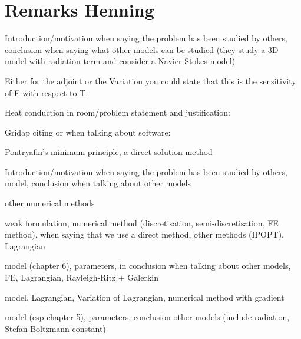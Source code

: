 \documentclass[landscape,parskip=half,7pt]{scrartcl}
\begin{document}
	\section{Remarks Henning}

	\cite{TabarkiMabrouk2012ModelingEperimentationHeatExchangesRoomHeatedRadiatorjournalArticle} Introduction/motivation when saying the problem has been studied by others, conclusion when saying what other models can be studied (they study a 3D model with radiation term and consider a Navier-Stokes model)

	Either for the adjoint or the Variation you could state that this is the sensitivity of E with respect to T.

	Heat conduction in room/problem statement and justification: \cite{HahnOzisik2012Heatconductionbook}

	Gridap citing or when talking about software: \cite{BadiaVerdugo2020GridapextensibleFiniteElementtoolboxJuliajournalArticle} \cite{VerdugoBadia2022softwaredesignGridapFiniteElementpackagebasedJuliaJITcompilerjournalArticle}

	Pontryafin's minimum principle, a direct solution method \cite{VanKeulen2014IndirectsolutionoptimalcontrolproblemspurestateconstraintjournalArticle}

	\cite{TrapnesOptimalTemperatureControlRoomsjournalArticle} Introduction/motivation when saying the problem has been studied by others, model, conclusion when talking about other models

	\cite{PulsipherZhangHongistoZavala2022UnifyingModelingAbstractionInfiniteDimensionalOptimizationjournalArticle} other numerical methods

	\cite{LoosdirekteMethodefuerOptimalsteuerungsproblememitparabolischenDifferentialgleichungenwebpage} weak formulation, numerical method (discretisation, semi-discretisation, FE method), when saying that we use a direct method, other methods (IPOPT), Lagrangian

	\cite{LewisNithiarasuSeetharamu2004FundamentalsFiniteElementMethodHeatFluidFlowbook} model (chapter 6), parameters, in conclusion when talking about other models, FE, Lagrangian, Rayleigh-Ritz + Galerkin

	\cite{Jaksch2017ImplementationadjointthermalsolverinverseproblemsconferencePaper} model, Lagrangian, Variation of Lagrangian, numerical method with gradient

	\cite{IncroperaDewittBergmanLavine2007Fundamentalsheatmasstransferbook} model (esp chapter 5), parameters, conclusion other models (include radiation, Stefan-Boltzmann constant)
\end{document}
